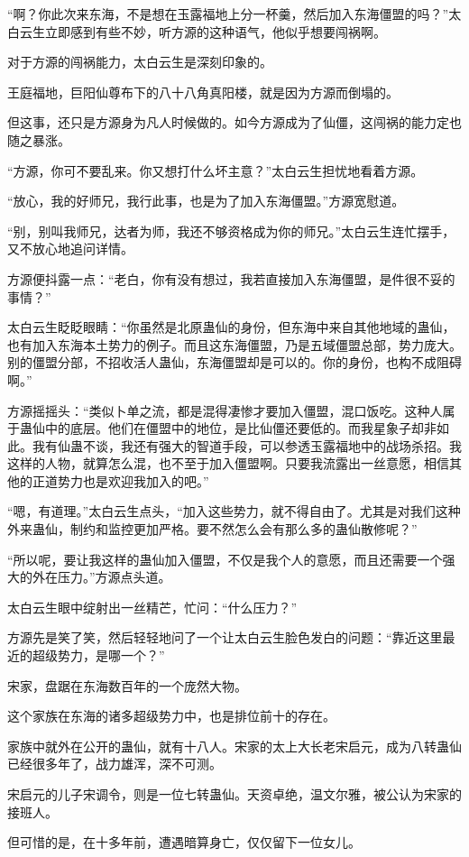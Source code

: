 \begin{this_body}
“啊？你此次来东海，不是想在玉露福地上分一杯羹，然后加入东海僵盟的吗？”太白云生立即感到有些不妙，听方源的这种语气，他似乎想要闯祸啊。

对于方源的闯祸能力，太白云生是深刻印象的。

王庭福地，巨阳仙尊布下的八十八角真阳楼，就是因为方源而倒塌的。

但这事，还只是方源身为凡人时候做的。如今方源成为了仙僵，这闯祸的能力定也随之暴涨。

“方源，你可不要乱来。你又想打什么坏主意？”太白云生担忧地看着方源。

“放心，我的好师兄，我行此事，也是为了加入东海僵盟。”方源宽慰道。

“别，别叫我师兄，达者为师，我还不够资格成为你的师兄。”太白云生连忙摆手，又不放心地追问详情。

方源便抖露一点：“老白，你有没有想过，我若直接加入东海僵盟，是件很不妥的事情？”

太白云生眨眨眼睛：“你虽然是北原蛊仙的身份，但东海中来自其他地域的蛊仙，也有加入东海本土势力的例子。而且这东海僵盟，乃是五域僵盟总部，势力庞大。别的僵盟分部，不招收活人蛊仙，东海僵盟却是可以的。你的身份，也构不成阻碍啊。”

方源摇摇头：“类似卜单之流，都是混得凄惨才要加入僵盟，混口饭吃。这种人属于蛊仙中的底层。他们在僵盟中的地位，是比仙僵还要低的。而我星象子却非如此。我有仙蛊不谈，我还有强大的智道手段，可以参透玉露福地中的战场杀招。我这样的人物，就算怎么混，也不至于加入僵盟啊。只要我流露出一丝意愿，相信其他的正道势力也是欢迎我加入的吧。”

“嗯，有道理。”太白云生点头，“加入这些势力，就不得自由了。尤其是对我们这种外来蛊仙，制约和监控更加严格。要不然怎么会有那么多的蛊仙散修呢？”

“所以呢，要让我这样的蛊仙加入僵盟，不仅是我个人的意愿，而且还需要一个强大的外在压力。”方源点头道。

太白云生眼中绽射出一丝精芒，忙问：“什么压力？”

方源先是笑了笑，然后轻轻地问了一个让太白云生脸色发白的问题：“靠近这里最近的超级势力，是哪一个？”

宋家，盘踞在东海数百年的一个庞然大物。

这个家族在东海的诸多超级势力中，也是排位前十的存在。

家族中就外在公开的蛊仙，就有十八人。宋家的太上大长老宋启元，成为八转蛊仙已经很多年了，战力雄浑，深不可测。

宋启元的儿子宋调令，则是一位七转蛊仙。天资卓绝，温文尔雅，被公认为宋家的接班人。

但可惜的是，在十多年前，遭遇暗算身亡，仅仅留下一位女儿。


\end{this_body}
